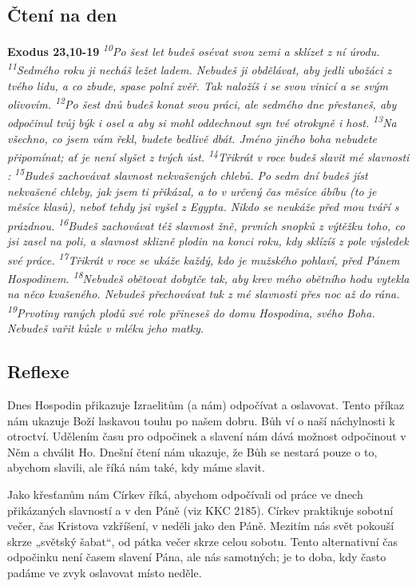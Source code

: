 \documentclass[11pt]{article}
\begin{document}
\subsection*{Čtení na den}
\textbf{Exodus 23,10-19}
\newline
\textit{
\textsuperscript{10}Po šest let budeš osévat svou zemi a sklízet z ní úrodu.
\textsuperscript{11}Sedmého roku ji necháš ležet ladem. Nebudeš ji obdělávat, aby jedli ubožáci z tvého lidu, a co zbude, spase polní zvěř. Tak naložíš i se svou vinicí a se svým olivovím.
\textsuperscript{12}Po šest dnů budeš konat svou práci, ale sedmého dne přestaneš, aby odpočinul tvůj býk i osel a aby si mohl oddechnout syn tvé otrokyně i host.
\textsuperscript{13}Na všechno, co jsem vám řekl, budete bedlivě dbát. Jméno jiného boha nebudete připomínat; ať je není slyšet z tvých úst.
\textsuperscript{14}Třikrát v roce budeš slavit mé slavnosti :
\textsuperscript{15}Budeš zachovávat slavnost nekvašených chlebů. Po sedm dní budeš jíst nekvašené chleby, jak jsem ti přikázal, a to v určený čas měsíce ábíbu (to je měsíce klasů), neboť tehdy jsi vyšel z Egypta. Nikdo se neukáže před mou tváří s prázdnou.
\textsuperscript{16}Budeš zachovávat též slavnost žně, prvních snopků z výtěžku toho, co jsi zasel na poli, a slavnost sklizně plodin na konci roku, kdy sklízíš z pole výsledek své práce.
\textsuperscript{17}Třikrát v roce se ukáže každý, kdo je mužského pohlaví, před Pánem Hospodinem.
\textsuperscript{18}Nebudeš obětovat dobytče tak, aby krev mého obětního hodu vytekla na něco kvašeného. Nebudeš přechovávat tuk z mé slavnosti přes noc až do rána.
\textsuperscript{19}Prvotiny raných plodů své role přineseš do domu Hospodina, svého Boha. Nebudeš vařit kůzle v mléku jeho matky.
}

\subsection*{Reflexe}
Dnes Hospodin přikazuje Izraelitům (a nám) odpočívat a oslavovat. Tento příkaz nám ukazuje Boží laskavou
touhu po našem dobru. Bůh ví o naší náchylnosti k otroctví. Udělením času pro odpočinek a slavení nám
dává možnost odpočinout v Něm a chválit Ho. Dnešní čtení nám ukazuje, že Bůh se nestará pouze o to,
abychom slavili, ale říká nám také, kdy máme slavit.

Jako křesťanům nám Církev říká, abychom odpočívali od práce ve dnech přikázaných slavností a v den Páně
(viz KKC 2185). Církev praktikuje sobotní večer, čas Kristova vzkříšení, v neděli jako den Páně. Mezitím
nás svět pokouší skrze „světský šabat“, od pátka večer skrze celou sobotu. Tento alternativní čas odpočinku
není časem slavení Pána, ale nás samotných; je to doba, kdy často padáme ve zvyk oslavovat místo neděle.
\end{document}
